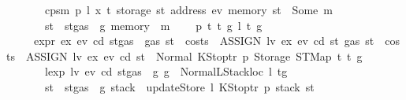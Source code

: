 \begin{isabellebody}
\ \ \ \ \ \ \ {\isachardoublequoteopen}cps{}m\ p\ l\ x\ t\ {\isacharparenleft}{\kern0pt}storage\ st\ {\isacharparenleft}{\kern0pt}address\ ev{\isacharparenright}{\kern0pt}{\isacharparenright}{\kern0pt}\ {\isacharparenleft}{\kern0pt}memory\ st{\isacharparenright}{\kern0pt}\ {\isacharequal}{\kern0pt}\ Some\ m{\isachardoublequoteclose}\isanewline
\ \ \ \ \ \ \ {\isachardoublequoteopen}st{\isacharprime}{\kern0pt}\ {\isacharequal}{\kern0pt}\ st{\isasymlparr}gas\ {\isacharcolon}{\kern0pt}{\isacharequal}{\kern0pt}\ g{\isacharprime}{\kern0pt}{\isacharcomma}{\kern0pt}\ memory\ {\isacharcolon}{\kern0pt}{\isacharequal}{\kern0pt}\ m{\isasymrparr}{\isachardoublequoteclose}\isanewline
\ \ {\isacharbar}{\kern0pt}\ {\isacharparenleft}{\kern0pt}{}{}{\isacharparenright}{\kern0pt}\ p\ t\ t{\isacharprime}{\kern0pt}\ g\ l\ t{\isacharprime}{\kern0pt}{\isacharprime}{\kern0pt}\ g{\isacharprime}{\kern0pt}\isanewline
\ \ \ \ \ {\isachardoublequoteopen}expr\ ex\ ev\ cd\ {\isacharparenleft}{\kern0pt}st{\isasymlparr}gas\ {\isacharcolon}{\kern0pt}{\isacharequal}{\kern0pt}\ gas\ st\ {\isacharminus}{\kern0pt}\ costs\ \ {\isacharparenleft}{\kern0pt}ASSIGN\ lv\ ex{\isacharparenright}{\kern0pt}\ ev\ cd\ st{\isasymrparr}{\isacharparenright}{\kern0pt}\ {\isacharparenleft}{\kern0pt}gas\ st\ {\isacharminus}{\kern0pt}\ costs\ \ {\isacharparenleft}{\kern0pt}ASSIGN\ lv\ ex{\isacharparenright}{\kern0pt}\ ev\ cd\ st{\isacharparenright}{\kern0pt}\ {\isacharequal}{\kern0pt}\ Normal\ {\isacharparenleft}{\kern0pt}{\isacharparenleft}{\kern0pt}KStoptr\ p{\isacharcomma}{\kern0pt}\ Storage\ {\isacharparenleft}{\kern0pt}STMap\ t\ t{\isacharprime}{\kern0pt}{\isacharparenright}{\kern0pt}{\isacharparenright}{\kern0pt}{\isacharcomma}{\kern0pt}\ g{\isacharparenright}{\kern0pt}{\isachardoublequoteclose}\isanewline
\ \ \ \ \ \ \ {\isachardoublequoteopen}lexp\ lv\ ev\ cd\ {\isacharparenleft}{\kern0pt}st{\isasymlparr}gas\ {\isacharcolon}{\kern0pt}{\isacharequal}{\kern0pt}\ g{\isasymrparr}{\isacharparenright}{\kern0pt}\ g\ {\isacharequal}{\kern0pt}\ Normal{\isacharparenleft}{\kern0pt}{\isacharparenleft}{\kern0pt}LStackloc\ l{\isacharcomma}{\kern0pt}\ t{\isacharprime}{\kern0pt}{\isacharprime}{\kern0pt}{\isacharparenright}{\kern0pt}{\isacharcomma}{\kern0pt}g{\isacharprime}{\kern0pt}{\isacharparenright}{\kern0pt}{\isachardoublequoteclose}\isanewline
\ \ \ \ \ \ \ {\isachardoublequoteopen}st{\isacharprime}{\kern0pt}\ {\isacharequal}{\kern0pt}\ st{\isasymlparr}gas\ {\isacharcolon}{\kern0pt}{\isacharequal}{\kern0pt}\ g{\isacharprime}{\kern0pt}{\isacharcomma}{\kern0pt}\ stack\ {\isacharcolon}{\kern0pt}{\isacharequal}{\kern0pt}\ updateStore\ l\ {\isacharparenleft}{\kern0pt}KStoptr\ p{\isacharparenright}{\kern0pt}\ {\isacharparenleft}{\kern0pt}stack\ st{\isacharparenright}{\kern0pt}{\isasymrparr}{\isachardoublequoteclose}\isanewline

\end{isabellebody}
